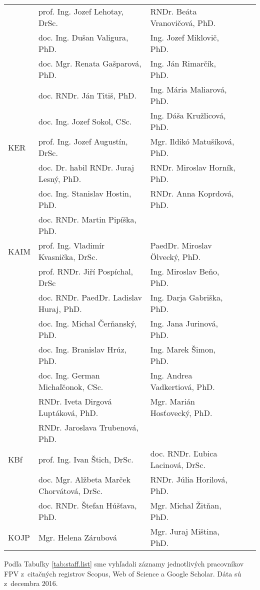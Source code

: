 \begin{table}
\begin{tabular}{lllll}
       & prof. Ing. Jozef Lehotay, DrSc. & RNDr. Beáta Vranovičová, PhD. \\
       & doc. Ing. Dušan Valigura, PhD. & Ing. Jozef Miklovič, PhD. \\
       & doc. Mgr. Renata Gašparová, PhD. & Ing. Ján Rimarčík, PhD. \\
       & doc. RNDr. Ján Titiš, PhD. & Ing. Mária Maliarová, PhD. \\
       & doc. Ing. Jozef Sokol, CSc. & Ing. Dáša Kružlicová, PhD. \\ [2ex]
  KER  & prof. Ing. Jozef Augustín, DrSc. & Mgr. Ildikó Matušíková, PhD. \\
       & doc. Dr. habil RNDr. Juraj Lesný, PhD. & RNDr. Miroslav Horník, PhD. \\
       & doc. Ing. Stanislav Hostin, PhD. &  RNDr. Anna Koprdová, PhD.\\
       & doc. RNDr. Martin Pipíška, PhD. &  \\[2ex]
  KAIM & prof. Ing. Vladimír Kvasnička, DrSc. & PaedDr. Miroslav Ölvecký, PhD. \\
       & prof. RNDr. Jiří Pospíchal, DrSc & Ing. Miroslav Beňo, PhD. \\
       & doc. RNDr. PaedDr. Ladislav Huraj, PhD. & Ing. Darja Gabriška, PhD. \\
       & doc. Ing. Michal Čerňanský, PhD. & Ing. Jana Jurinová, PhD.  \\
       & doc. Ing. Branislav Hrúz, PhD. & Ing. Marek Šimon, PhD. \\
       & doc. Ing. German Michaľčonok, CSc. & Ing. Andrea Vadkertiová, PhD. \\
       & RNDr. Iveta Dirgová Luptáková, PhD. & Mgr. Marián Hosťovecký, PhD. \\
       & RNDr. Jaroslava Trubenová, PhD. &  \\[2ex]
  KBf  & prof. Ing. Ivan Štich, DrSc.  & doc. RNDr. Ľubica Lacinová, DrSc. \\
       & doc. Mgr. Alžbeta Marček Chorvátová, DrSc. & RNDr. Júlia Horilová, PhD. \\
       & doc. RNDr. Štefan Húšťava, PhD. & Mgr. Michal Žitňan, PhD. \\[2ex]
  KOJP & Mgr. Helena Zárubová & Mgr. Juraj Miština, PhD. \\[0.5ex]
  \bottomrule
\end{tabular}
\end{table}

Podľa Tabuľky \ref{tab:staff.list} sme vyhľadali záznamy jednotlivých
pracovníkov FPV z~citačných registrov Scopus, Web of Science a Google Scholar.
Dáta sú z~decembra 2016.

